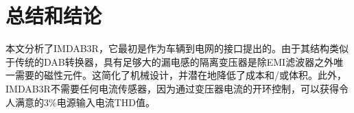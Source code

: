 \documentclass[journal]{IEEEtran}
\begin{document}
%




\section{总结和结论}

本文分析了IMDAB3R，它最初是作为车辆到电网的接口提出的。由于其结构类似于传统的DAB转换器，具有足够大的漏电感的隔离变压器是除EMI滤波器之外唯一需要的磁性元件。这简化了机械设计，并潜在地降低了成本和/或体积。此外，IMDAB3R不需要任何电流传感器，因为通过变压器电流的开环控制，可以获得令人满意的3\%电源输入电流THD值。


\end{document}
